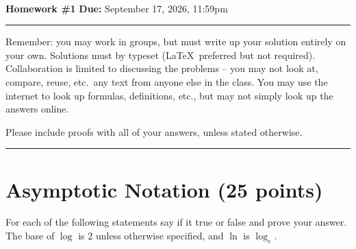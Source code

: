\documentclass[11pt]{article}
\begin{document}
\\
{{\bf Homework \#1}} \hfill {{\bf Due:} September 17, 2026, 11:59pm} \\
\rule[0.1in]{\textwidth}{0.4pt}

Remember: you may work in groups, but must write up your solution entirely on your own.  Solutions must by typeset (\LaTeX\ preferred but not required).  Collaboration is limited to discussing the problems -- you may not look at, compare, reuse, etc.~any text from anyone else in the class.  You may use the internet to look up formulas, definitions, etc., but may not simply look up the answers online.  

Please include proofs with all of your answers, unless stated otherwise.

\noindent \rule[0.1in]{\textwidth}{0.4pt}

\section{Asymptotic Notation (25 points)}

For each of the following statements say if it true or false and prove your answer.  The base of $\log$ is $2$ unless otherwise specified, and $\ln$ is $\log_e$.
\end{document}
